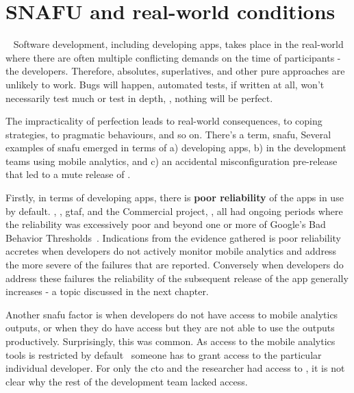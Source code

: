 \section{SNAFU and real-world conditions}~\label{aiu-snafu-and-real-world-conditions-theme}
Software development, including developing apps, takes place in the real-world where there are often multiple conflicting demands on the time of participants - the developers. Therefore, absolutes, superlatives, and other pure approaches are unlikely to work. Bugs will happen, automated tests, if written at all, won't necessarily test much or test in depth, , nothing will be perfect.

The impracticality of perfection leads to real-world consequences, to coping strategies, to pragmatic behaviours, and so on. There's a term, \Gls{snafu}, Several examples of \Gls{snafu} emerged in terms of a) developing apps, b) in the development teams using mobile analytics, and c) an accidental misconfiguration pre-release that led to a mute release of .

Firstly, in terms of developing apps, there is \textbf{poor reliability} of the apps in use by default. , , \Gls{gtaf}, and the Commercial project, , all had ongoing periods where the reliability was excessively poor and beyond one or more of Google's Bad Behavior Thresholds~. Indications from the evidence gathered is poor reliability accretes when developers do not actively monitor mobile analytics and address the more severe of the failures that are reported. Conversely when developers do address these failures the reliability of the subsequent release of the app generally increases - a topic discussed in the next chapter.

Another \Gls{snafu} factor is when developers do not have access to mobile analytics outputs, or when they do have access but they are not able to use the outputs productively. Surprisingly, this was common. As access to the mobile analytics tools is restricted by default~ someone has to grant access to the particular individual developer. For  only the \Gls{cto} and the researcher had access to , it is not clear why the rest of the development team lacked access.

